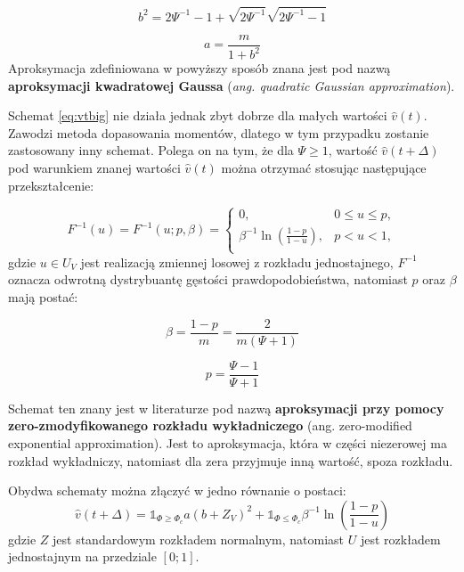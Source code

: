 \documentclass{pracamgr}
\begin{document}
\begin{equation}
\label{eq:b}
b^2 = 2 \Psi^{-1} - 1 + \sqrt{2 \Psi^{-1}} \sqrt{2 \Psi^{-1} - 1}
\end{equation}

\begin{equation}
\label{eq:a}
a = \frac{m}{1 + b^2}
\end{equation}
Aproksymacja zdefiniowana w powyższy sposób znana jest pod nazwą 
\textbf{aproksymacji kwadratowej Gaussa} (\textit{ang. quadratic Gaussian approximation}).


Schemat \ref{eq:vtbig} nie działa jednak zbyt dobrze dla małych wartości $\hat{v}(t)$. Zawodzi metoda 
dopasowania momentów, dlatego w tym przypadku 
zostanie zastosowany inny schemat. Polega on na tym, że dla $\Psi \geq 1$, wartość 
$\hat{v}(t + \Delta)$ pod warunkiem znanej wartości $\hat{v}(t)$ można otrzymać 
stosując następujące przekształcenie:

\begin{equation}
\label{eq:psi}
F^{-1}(u) = F^{-1}(u;p,\beta) = \begin{cases}
               0, & 0 \le u \leq p,\\
               \beta^{-1} \ln (\frac{1-p}{1-u}), & p < u < 1, \\
            \end{cases} 
\end{equation} 
gdzie $u \in U_V$ jest realizacją zmiennej losowej z rozkładu jednostajnego, $F^{-1}$ oznacza
odwrotną dystrybuantę gęstości prawdopodobieństwa, natomiast $p$ oraz $\beta$ mają postać:

\begin{equation}
\label{eq:beta}
\beta = \frac{1-p}{m} = \frac{2}{m(\Psi + 1)}
\end{equation}

\begin{equation}
\label{eq:p}
p = \frac{\Psi - 1}{\Psi + 1}
\end{equation}

Schemat ten znany jest w literaturze pod nazwą \textbf{aproksymacji przy pomocy 
zero-zmodyfikowanego rozkładu wykładniczego} (ang. zero-modified exponential approximation). 
Jest to aproksymacja, która w części niezerowej ma 
rozkład wykładniczy, natomiast dla zera przyjmuje inną wartość, spoza rozkładu. 


Obydwa schematy można złączyć w jedno równanie o postaci:
\begin{equation}
\label{eq:andersen}
\hat{v}(t + \Delta)  = \mathds{1}_{\Phi \geq \Phi_c} a (b + Z_V)^2
 + \mathds{1}_{\Phi \le \Phi_c} \beta^{-1} \ln (\frac{1-p}{1-u})
\end{equation}
gdzie $Z$ jest standardowym rozkładem normalnym, natomiast $U$ jest rozkładem jednostajnym na 
przedziale $[0;1]$.
\end{document}
